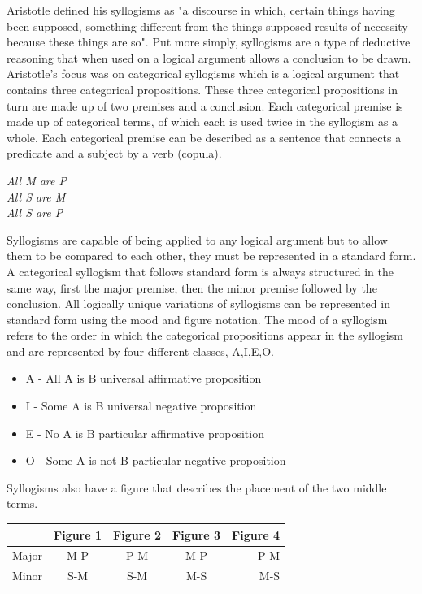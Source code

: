 \documentclass[12pt,a4paper]{report}
\newenvironment{tightcenter}{%
  \setlength\topsep{0pt}
  \setlength\parskip{0pt}
  \begin{center}
}{%
  \end{center}
}
\begin{document}
Aristotle defined his syllogisms as "a discourse in which, certain things having been supposed, something different from the things supposed results of necessity because these things are so". Put more simply, syllogisms are a type of deductive reasoning that when used on a logical argument allows a conclusion to be drawn. Aristotle's focus was on categorical syllogisms which is a logical argument that contains three categorical propositions. These three categorical propositions in turn are made up of two premises and a conclusion. Each categorical premise is made up of categorical terms, of which each is used twice in the syllogism as a whole. Each categorical premise can be described as a sentence that connects a predicate and a subject by a verb (copula). 
\bigbreak
\begin{tightcenter}
\textit{All M are P}\\ 
\textit{All S are M}\\
\textit{All S are P}\\
\end{tightcenter}
\bigbreak
Syllogisms are capable of being applied to any logical argument but to allow them to be compared to each other, they must be represented in a standard form. A categorical syllogism that follows standard form is always structured in the same way, first the major premise, then the minor premise followed by the conclusion. All logically unique variations of syllogisms can be represented in standard form using the mood and figure notation. The mood of a syllogism refers to the order in which the categorical propositions appear in the syllogism and are represented by four different classes, A,I,E,O.
\begin{itemize}
\item A - All A is B      universal affirmative proposition
\item I - Some A is B     universal negative proposition
\item E - No A is B    particular affirmative proposition
\item O - Some A is not B    particular negative proposition
\end{itemize}
Syllogisms also have a figure that describes the placement of the two middle terms.

\begin{center}
  \begin{tabular}{ l | c | c | c | r }
     & Figure 1 & Figure 2 & Figure 3 & Figure 4 \\ \hline
    Major & M-P & P-M & M-P & P-M \\ \hline
    Minor & S-M & S-M & M-S & M-S \\
  \end{tabular}
\end{center}
\end{document}
